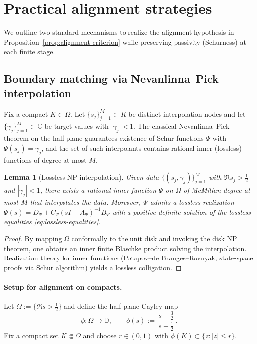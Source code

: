 \documentclass[11pt]{article}
\newtheorem{lemma}[theorem]{Lemma}
\theoremstyle{definition}
\theoremstyle{remark}
\newcommand{\C}{\mathbb{C}}
\begin{document}
\section{Practical alignment strategies}\label{sec:practical-alignment}
We outline two standard mechanisms to realize the alignment hypothesis in Proposition~\ref{prop:alignment-criterion} while preserving passivity (Schurness) at each finite stage.

\subsection{Boundary matching via Nevanlinna--Pick interpolation}
Fix a compact \(K\subset\Omega\). Let \(\{s_j\}_{j=1}^{M}\subset K\) be distinct interpolation nodes and let \(\{\gamma_j\}_{j=1}^{M}\subset\C\) be target values with \(|\gamma_j|<1\). The classical Nevanlinna--Pick theorem on the half-plane guarantees existence of Schur functions \(\Psi\) with \(\Psi(s_j)=\gamma_j\), and the set of such interpolants contains rational inner (lossless) functions of degree at most \(M\).

\begin{lemma}[Lossless NP interpolation]\label{lem:NP-lossless}
Given data \(\{(s_j,\gamma_j)\}_{j=1}^{M}\) with \(\Re s_j>\tfrac12\) and \(|\gamma_j|<1\), there exists a rational inner function \(\Psi\) on \(\Omega\) of McMillan degree at most \(M\) that interpolates the data. Moreover, \(\Psi\) admits a lossless realization \(\Psi(s)=D_\Psi+C_\Psi(sI-A_\Psi)^{-1}B_\Psi\) with a positive definite solution of the lossless equalities \eqref{eq:lossless-equalities}.
\end{lemma}
\begin{proof}
By mapping \(\Omega\) conformally to the unit disk and invoking the disk NP theorem, one obtains an inner finite Blaschke product solving the interpolation. Realization theory for inner functions (Potapov--de Branges--Rovnyak; state-space proofs via Schur algorithm) yields a lossless colligation.
\end{proof}

\paragraph{Setup for alignment on compacts.}
Let \(\Omega:=\{\Re s>\tfrac12\}\) and define the half-plane Cayley map
\[
  \phi: \Omega\to\mathbb D,\qquad \phi(s):=\frac{s-\tfrac32}{\,s+\tfrac12\,}.
\]
Fix a compact set \(K\Subset\Omega\) and choose \(r\in(0,1)\) with \(\phi(K)\subset\{z:|z|\le r\}\).
\end{document}
